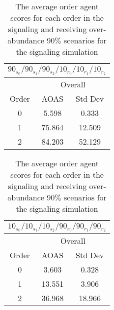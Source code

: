 \begin{table}[h]
    \centering
    \begin{tabular}{|c|c|c|}
    \hline
    \multicolumn{3}{|c|}{$90_{s_{0}}/90_{s_{1}}/90_{s_{2}}/10_{r_{0}}/10_{r_{1}}/10_{r_{2}}$} \\
    \hline
    \multicolumn{1}{|c|}{} & \multicolumn{2}{|c|}{Overall} \\
    \hline
    Order & AOAS & Std Dev \\
    \hline
    0     & 5.598   & 0.333    \\
    1     & 75.864  & 12.509  \\ 
    2     & 84.203  & 52.129   \\
    \hline
    \end{tabular}
    \qquad
    \begin{tabular}{|c|c|c|}
    \hline
    \multicolumn{3}{|c|}{$10_{s_{0}}/10_{s_{1}}/10_{s_{2}}/90_{r_{0}}/90_{r_{1}}/90_{r_{2}}$} \\
    \hline
    \multicolumn{1}{|c|}{} & \multicolumn{2}{|c|}{Overall} \\
    \hline
    Order & AOAS & Std Dev \\
    \hline
    0     & 3.603   & 0.328    \\
    1     & 13.551  & 3.906   \\
    2     & 36.968  & 18.966   \\
    \hline
    \end{tabular}
    \caption{The average order agent scores for each order in the signaling and receiving over-abundance $90\%$ scenarios for the signaling simulation}
    \label{table:sig-overall-90}
\end{table}